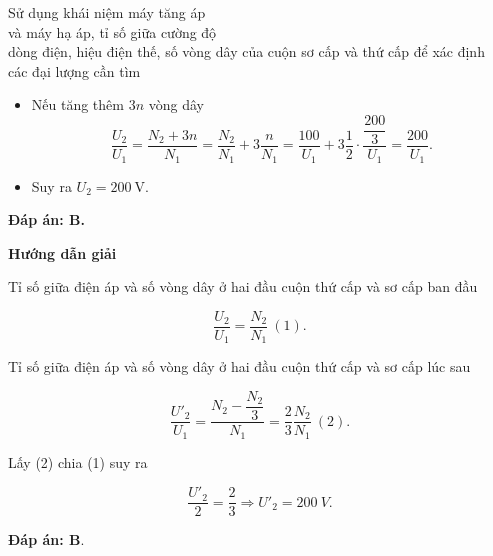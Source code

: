 \begin{dang}{Sử dụng khái niệm máy tăng áp \\ và máy hạ áp, tỉ số giữa cường độ\\ dòng điện, hiệu điện thế, số vòng dây của cuộn sơ cấp và thứ cấp để xác định \\các đại lượng cần tìm}
{\begin{itemize}
			\begin{equation*}
				\dfrac{U}{U_1}=\dfrac{2n}{N_1} \Rightarrow \dfrac{1}{2}\dfrac{U}{U_1}=\dfrac{n}{N_1}.
			\end{equation*}
			\item Nếu tăng thêm $3n$ vòng dây
			\begin{equation*}
				\dfrac{U_2}{U_1}=\dfrac{N_2+3n}{N_1} = \dfrac{N_2}{N_1} + 3\dfrac{n}{N_1} = \dfrac{100}{U_1} + 3\dfrac{1}{2} \cdot \dfrac{\dfrac{200}{3}}{U_1} = \dfrac{200}{U_1}.
			\end{equation*}
			\item Suy ra $U_2=200\ \text{V}$.
		\end{itemize}
		
		\textbf{Đáp án: B.}
	}
	
	{	\begin{center}
			\textbf{Hướng dẫn giải}
		\end{center}
		
		Tỉ số giữa điện áp và số vòng dây ở hai đầu cuộn thứ cấp và sơ cấp ban đầu
		
		$$\dfrac{U_2}{U_1} = \dfrac{N_2}{N_1}\ (1).$$
		
		Tỉ số giữa điện áp và số vòng dây ở hai đầu cuộn thứ cấp và sơ cấp lúc sau
		
		$$\dfrac{U'_2}{U_1} = \dfrac{N_2-\dfrac{N_2}{3}}{N_1}= \dfrac{2}{3} \dfrac{N_2}{N_1}\ (2).$$
		
		Lấy (2) chia (1) suy ra
		
		$$\dfrac{U'_2}{2} = \dfrac{2}{3} \Rightarrow U'_2 =\SI{200}{V}.$$
		
		\textbf{Đáp án: B}.
	}
\end{dang}

